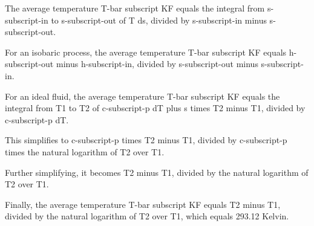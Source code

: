 The average temperature T-bar subscript KF equals the integral from s-subscript-in to s-subscript-out of T ds, divided by s-subscript-in minus s-subscript-out.

For an isobaric process, the average temperature T-bar subscript KF equals h-subscript-out minus h-subscript-in, divided by s-subscript-out minus s-subscript-in.

For an ideal fluid, the average temperature T-bar subscript KF equals the integral from T1 to T2 of c-subscript-p dT plus s times T2 minus T1, divided by c-subscript-p dT.

This simplifies to c-subscript-p times T2 minus T1, divided by c-subscript-p times the natural logarithm of T2 over T1.

Further simplifying, it becomes T2 minus T1, divided by the natural logarithm of T2 over T1.

Finally, the average temperature T-bar subscript KF equals T2 minus T1, divided by the natural logarithm of T2 over T1, which equals 293.12 Kelvin.